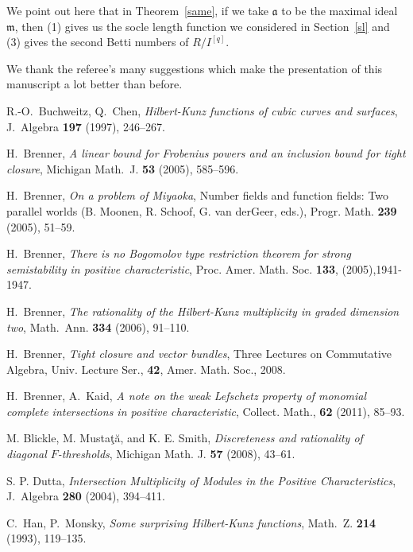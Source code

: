 \documentclass[draft]{amsart}
\theoremstyle{definition}
\numberwithin{equation}{theorem}
\begin{document}
 We point out here that in Theorem~\ref{same}, if we take ${\mathfrak{a}}$ to be the maximal ideal ${\mathfrak{m}}$, then (1) gives us the socle length function we considered in Section~\ref{sl} and (3) gives the second Betti numbers of $R/I^{[q]}$. 

We thank the referee's many suggestions which make the presentation of this manuscript a lot better than before. 
 
\begin{thebibliography}{99}

R.-O.\ Buchweitz, Q.\ Chen, 
\textit{Hilbert-Kunz functions of cubic curves and surfaces}, 
J.\ Algebra {\bf 197} (1997), 246--267.

H.\ Brenner, 
\textit{A linear bound for Frobenius powers and an inclusion bound for tight closure}, 
Michigan Math.\ J. {\bf 53} (2005), 585--596.

H.\ Brenner, 
\textit{On a problem of Miyaoka}, 
Number fields and function fields: Two parallel worlds (B. Moonen, R. Schoof, G. van derGeer, eds.), Progr. Math. {\bf 239} (2005), 51--59.

H.\ Brenner, 
\textit{There is no Bogomolov type restriction theorem for strong semistability in positive characteristic}, Proc. Amer. Math. Soc. {\bf 133}, (2005),1941-1947.

H.\ Brenner, 
\textit{The rationality of the Hilbert-Kunz multiplicity in graded dimension two},
Math.\ Ann. {\bf 334} (2006), 91--110.

H.\ Brenner, 
\textit{Tight closure and vector bundles}, Three Lectures on Commutative Algebra, Univ. Lecture Ser., {\bf 42}, Amer. Math. Soc., 2008.

H.\ Brenner, A.\ Kaid,
\textit{A note on the weak Lefschetz property of monomial complete intersections in positive characteristic}, Collect. Math., {\bf 62} (2011), 85--93.

M. Blickle, M. Musta{\c t}{\u a}, and K. E. Smith,
\textit{Discreteness and rationality of diagonal $F$-thresholds}, Michigan Math. J. {\bf 57} (2008), 43--61.

S. P. Dutta, 
\textit{Intersection Multiplicity of Modules in the Positive Characteristics}, 
J.\ Algebra {\bf 280} (2004), 394--411.

C.\ Han, P.\ Monsky, 
\textit{Some surprising Hilbert-Kunz functions},
Math.\ Z. {\bf 214} (1993), 119--135.


\end{thebibliography}
\end{document}
